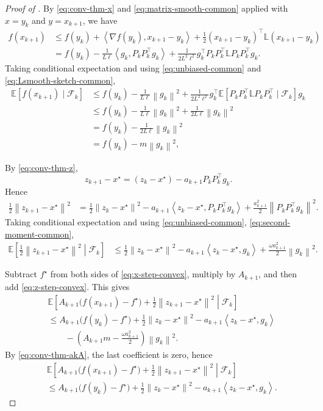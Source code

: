 \documentclass[10pt]{article}
\newcommand{\E}{\mathbb{E}}
\newcommand{\F}{\mathcal{F}}
\newcommand{\ip}[2]{\left\langle #1,#2\right\rangle}
\newcommand{\norm}[1]{\left\|#1\right\|}
\newcommand{\Lmat}{\mathbb{L}}
\begin{document}
\begin{proof}[Proof of ]
By \eqref{eq:conv-thm-x} and \eqref{eq:matrix-smooth-common} applied with
\(x=y_k\) and \(y=x_{k+1}\), we have
\begin{align}
f(x_{k+1})
&\le f(y_k)+\ip{\nabla f(y_k)}{x_{k+1}-y_k}
+\frac12 (x_{k+1}-y_k)^\top \Lmat (x_{k+1}-y_k) \\
&= f(y_k)-\frac{1}{L\ell}\ip{g_k}{P_kP_k^\top g_k}
+\frac{1}{2L^2\ell^2} g_k^\top P_kP_k^\top \Lmat P_kP_k^\top g_k.
\end{align}
Taking conditional expectation and using
\eqref{eq:unbiased-common} and \eqref{eq:Lsmooth-sketch-common},
\begin{align}
\E[f(x_{k+1})\mid \F_k]
&\le f(y_k)-\frac{1}{L\ell}\norm{g_k}^2
+\frac{1}{2L^2\ell^2}g_k^\top \E[P_kP_k^\top\Lmat P_kP_k^\top\mid \F_k] g_k \\
&\le f(y_k)-\frac{1}{L\ell}\norm{g_k}^2
+\frac{1}{2L\ell}\norm{g_k}^2 \\
&= f(y_k)-\frac{1}{2L\ell}\norm{g_k}^2 \\
&= f(y_k)-m\norm{g_k}^2,
\label{eq:x-step-convex}
\end{align}


By \eqref{eq:conv-thm-z},
\[
z_{k+1}-x^\star = (z_k-x^\star)-a_{k+1}P_kP_k^\top g_k.
\]
Hence
\begin{align}
\frac12 \norm{z_{k+1}-x^\star}^2
&=
\frac12 \norm{z_k-x^\star}^2
-a_{k+1}\ip{z_k-x^\star}{P_kP_k^\top g_k}
+\frac{a_{k+1}^2}{2}\norm{P_kP_k^\top g_k}^2.
\end{align}
Taking conditional expectation and using
\eqref{eq:unbiased-common}, \eqref{eq:second-moment-common},
\begin{align}
\E\!\left[\frac12 \norm{z_{k+1}-x^\star}^2 \middle| \F_k\right]
&\le
\frac12 \norm{z_k-x^\star}^2
-a_{k+1}\ip{z_k-x^\star}{g_k}
+\frac{\omega a_{k+1}^2}{2}\norm{g_k}^2.
\label{eq:z-step-convex}
\end{align}


Subtract \(f^\star\) from both sides of \eqref{eq:x-step-convex}, multiply by \(A_{k+1}\),
and then add \eqref{eq:z-step-convex}. This gives
\begin{align}
&\E\!\left[
A_{k+1}\bigl(f(x_{k+1})-f^\star\bigr)+\frac12 \norm{z_{k+1}-x^\star}^2
\middle| \F_k\right]
\nonumber\\
&\le
A_{k+1}\bigl(f(y_k)-f^\star\bigr)
+\frac12 \norm{z_k-x^\star}^2
-a_{k+1}\ip{z_k-x^\star}{g_k}
\nonumber\\
&\qquad
-\left(A_{k+1}m-\frac{\omega a_{k+1}^2}{2}\right)\norm{g_k}^2.
\label{eq:sum-convex-before}
\end{align}
By \eqref{eq:conv-thm-akA}, the last coefficient is zero, hence
\begin{align}
&\E\!\left[
A_{k+1}\bigl(f(x_{k+1})-f^\star\bigr)+\frac12 \norm{z_{k+1}-x^\star}^2
\middle| \F_k\right]
\nonumber\\
&\le
A_{k+1}\bigl(f(y_k)-f^\star\bigr)
+\frac12 \norm{z_k-x^\star}^2
-a_{k+1}\ip{z_k-x^\star}{g_k}.
\label{eq:sum-convex-after}
\end{align}



\end{proof}
\end{document}
